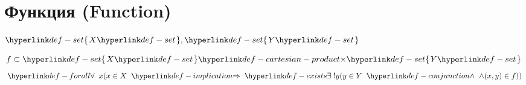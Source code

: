 
\section{Функция (Function)}

\hypertarget{def-function}{}
\begin{definition}
\label{entity:obj-function}
$\Set{X}, \Set{Y}$

\[ f \subset \Set{X} \CartesianProduct{\times} \Set{Y} \]
\[ \TerForall x (x \in X \TermImplication \TermExists ! y (y \in Y \TermConjunction{\land} (x, y) \in f)) \]
\end{definition}